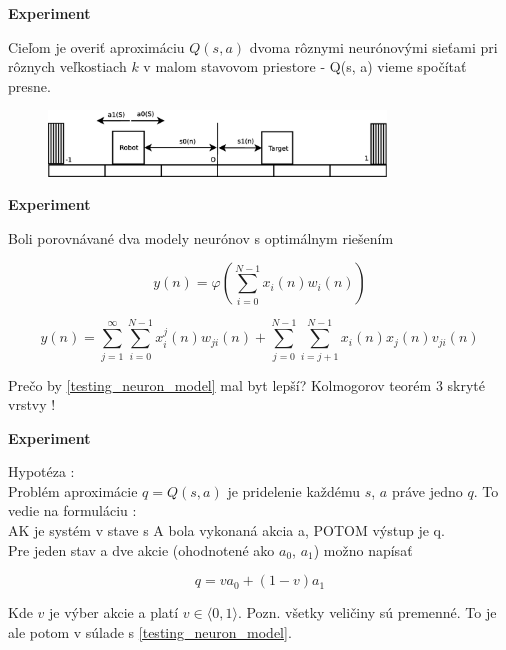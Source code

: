 \documentclass[xcolor=dvipsnames]{beamer}
\begin{document}
\begin{frame}{\bf Experiment}

Cieľom je overiť aproximáciu $Q(s, a)$ dvoma rôznymi neurónovými sieťami pri
rôznych veľkostiach $k$ v malom stavovom priestore - Q(s, a) vieme spočítať presne.

\begin{figure}[ht]
\begin{center}
\includegraphics[width=0.8\textwidth]{diagrams/1D_robot_diagram.eps}
\end{center}
\end{figure}

\end{frame}

\iffalse

\begin{frame}{\bf Experiment}

Boli porovnávané dva modely neurónov s optimálnym riešením

\begin{equation}
\label{mcculloch_pitts_model}
  y(n) = \varphi(\sum_{i = 0}^{N-1} x_i(n)w_i(n))
\end{equation}


\begin{equation}
\label{testing_neuron_model}
  y(n) = \sum_{j = 1}^{\infty}{\sum_{i = 0}^{N-1} x_i^j(n)w_{ji}(n)} +
  \sum_{j = 0}^{N-1}{\sum_{i = j + 1}^{N-1} x_i(n)x_j(n)v_{ji}(n)}
\end{equation}

Prečo by \ref{testing_neuron_model} mal byt lepší? Kolmogorov teorém 3 skryté vrstvy !

\end{frame}


\begin{frame}{\bf Experiment}

Hypotéza : \\
\bigskip
Problém aproximácie $q = Q(s, a)$ je pridelenie každému $s$, $a$ práve jedno $q$.
To vedie na formuláciu : \\
AK je systém v stave s A bola vykonaná akcia a, POTOM výstup je q. \\
\bigskip
Pre jeden stav a dve akcie (ohodnotené ako $a_0$, $a_1$) možno napísať

\begin{equation}
\label{multiplexer}
  q =  v a_0 + (1 - v) a_1
\end{equation}

Kde $v$ je výber akcie a platí $v \in \langle 0, 1 \rangle$. Pozn. všetky veličiny
sú premenné.
\bigskip
To je ale potom v súlade s \ref{testing_neuron_model}.

\end{frame}
\end{document}
